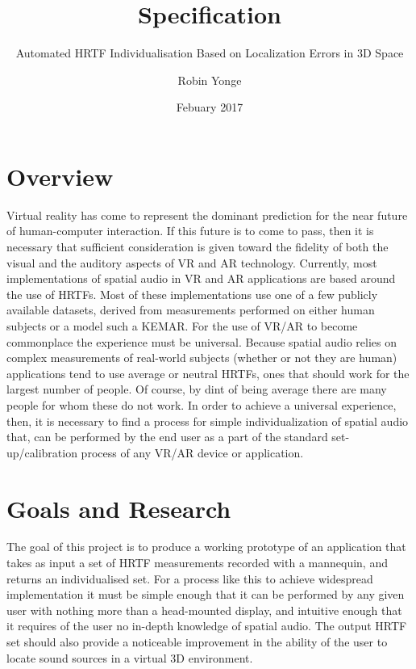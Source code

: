 \documentclass[10pt, oneside, a4paper, draft]{scrartcl}
\begin{document}
\title{Specification}
\subtitle{Automated HRTF Individualisation Based on Localization Errors in 3D Space}
\author{Robin Yonge}
\date{Febuary 2017}
\maketitle


\section*{Overview}
Virtual reality has come to represent the dominant prediction for the near future of human-computer interaction. If this future is to come to pass, then it is necessary that sufficient consideration is given toward the fidelity of both the visual and the auditory aspects of VR and AR technology. Currently, most implementations of spatial audio in VR and AR applications are based around the use of HRTFs. Most of these implementations use one of a few publicly available datasets, derived from measurements performed on either human subjects or a model such a KEMAR\citep{Algazi2001}\citep{Gardner1994}. For the use of VR/AR to become commonplace the experience must be universal. Because spatial audio relies on complex measurements of real-world subjects (whether or not they are human) applications tend to use average or neutral HRTFs, ones that should work for the largest number of people. Of course, by dint of being average there are many people for whom these do not work. In order to achieve a universal experience, then, it is necessary to find a process for  simple individualization of spatial audio that, can be performed by the end user as a part of the standard set-up/calibration process of any VR/AR device or application.


\section*{Goals and Research}
The goal of this project is to produce a working prototype of an application that takes as input a set of HRTF measurements recorded with a mannequin, and returns an individualised set. For a process like this to achieve widespread implementation it must be simple enough that it can be performed by any given user with nothing more than a head-mounted display, and intuitive enough that it requires of the user no in-depth knowledge of spatial audio. The output HRTF set should also provide a noticeable improvement in the ability of the user to locate sound sources in a virtual 3D environment.
\end{document}
